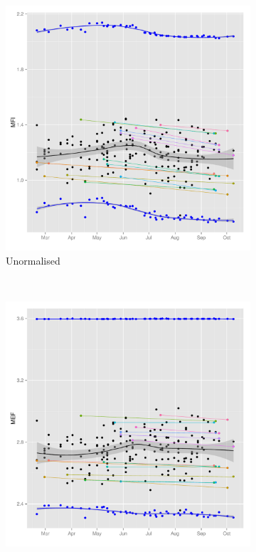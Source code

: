 \begin{figure}
\centering
\begin{subfigure}[b]{.4\textwidth}
    \centering
    \includegraphics[scale=.3]{figures/CD25-MFI-time-effect-repeatability.pdf}
    \caption{Unormalised}
\end{subfigure}
~
\begin{subfigure}[b]{.4\textwidth}
    \centering
    \includegraphics[scale=.3]{figures/CD25-MFI-time-effect-beads-normalised.pdf}

\end{subfigure}
\end{figure}
